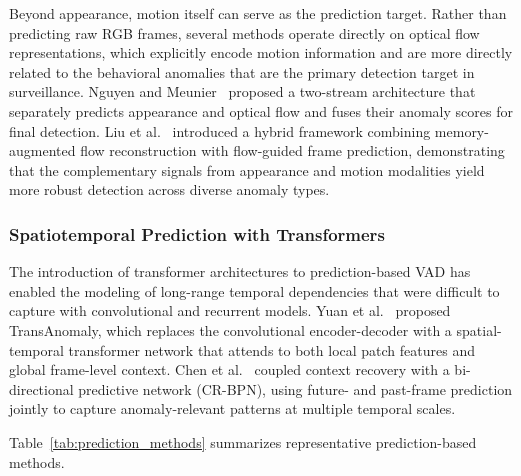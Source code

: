 \documentclass[10pt,a4paper]{article}
\begin{document}
Beyond appearance, motion itself can serve as the prediction target. Rather than predicting raw RGB frames, several methods operate directly on optical flow representations, which explicitly encode motion information and are more directly related to the behavioral anomalies that are the primary detection target in surveillance. Nguyen and Meunier~\citeyearpar{nguyen2019anomaly} proposed a two-stream architecture that separately predicts appearance and optical flow and fuses their anomaly scores for final detection. Liu et al.~\citeyearpar{liu2021hybrid} introduced a hybrid framework combining memory-augmented flow reconstruction with flow-guided frame prediction, demonstrating that the complementary signals from appearance and motion modalities yield more robust detection across diverse anomaly types.

\subsubsection{Spatiotemporal Prediction with Transformers}

The introduction of transformer architectures to prediction-based VAD has enabled the modeling of long-range temporal dependencies that were difficult to capture with convolutional and recurrent models. Yuan et al.~\citeyearpar{yuan2021transanomaly} proposed TransAnomaly, which replaces the convolutional encoder-decoder with a spatial-temporal transformer network that attends to both local patch features and global frame-level context. Chen et al.~\citeyearpar{chen2022comprehensive} coupled context recovery with a bi-directional predictive network (CR-BPN), using future- and past-frame prediction jointly to capture anomaly-relevant patterns at multiple temporal scales.

Table~\ref{tab:prediction_methods} summarizes representative prediction-based methods.
\end{document}
